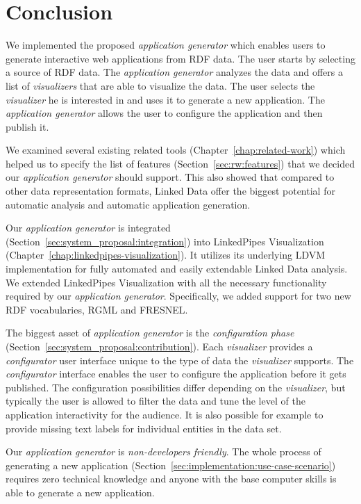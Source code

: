 \chapter*{Conclusion}

We implemented the proposed \emph{application generator} which enables users to generate interactive web applications from RDF data. The user starts by selecting a source of RDF data. The \emph{application generator} analyzes the data and offers a list of \emph{visualizers} that are able to visualize the data. The user selects the \emph{visualizer} he is interested in and uses it to generate a new application. The \emph{application generator} allows the user to configure the application and then publish it.

We examined several existing related tools (Chapter~\ref{chap:related-work}) which helped us to specify the list of features (Section~\ref{sec:rw:features}) that we decided our \emph{application generator} should support. This also showed that compared to other data representation formats, Linked Data offer the biggest potential for automatic analysis and automatic application generation.

Our \emph{application generator} is integrated (Section~\ref{sec:system_proposal:integration}) into LinkedPipes Visualization (Chapter~\ref{chap:linkedpipes-visualization}). It utilizes its underlying LDVM implementation for fully automated and easily extendable Linked Data analysis. We extended LinkedPipes Visualization with all the necessary functionality required by our \emph{application generator}. Specifically, we added support for two new RDF vocabularies, RGML and FRESNEL.

The biggest asset of \emph{application generator} is the \emph{configuration phase} (Section~\ref{sec:system_proposal:contribution}). Each \emph{visualizer} provides a \emph{configurator} user interface unique to the type of data the \emph{visualizer} supports. The \emph{configurator} interface enables the user to configure the application before it gets published. The configuration possibilities differ depending on the \emph{visualizer}, but typically the user is allowed to filter the data and tune the level of the application interactivity for the audience. It is also possible for example to provide missing text labels for individual entities in the data set.

Our \emph{application generator} is \emph{non-developers friendly}. The whole process of generating a new application (Section~\ref{sec:implementation:use-case-scenario}) requires zero technical knowledge and anyone with the base computer skills is able to generate a new application.

